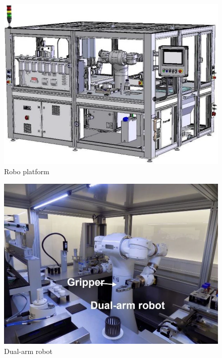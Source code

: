 \documentclass[12pt,twoside,a4paper,parskip]{scrbook} %
\begin{document}
\begin{figure}[H]
  \centering
  \includegraphics[scale=0.4]{figures/platform setup.png} %
  \caption{Robo platform}
  \label{fig:platform}
\end{figure}



\begin{figure}[H]
  \centering
  \includegraphics[scale=0.4]{figures/robot.png} %
  \caption{Dual-arm robot}
  \label{fig:Robot}
\end{figure}
\end{document}
